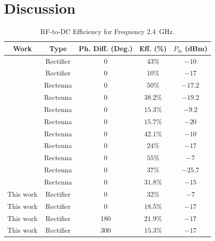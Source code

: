\documentclass[journal]{IEEEtran}
\begin{document}
\section{Discussion}
\label{sec:Discussion}
%
\begin{table}[t]
\renewcommand{\arraystretch}{1.1}
\caption{RF-to-DC  Efficiency for Frequency $2.4$~GHz.}
\label{tab:Designs}
\centering 
\begin{tabular}{c||c||c||c||c}
\hline\hline  
      Work                              & Type & Ph. Diff. (Deg.) & Eff.   (\%) & $P_\text{in}$ (dBm)  \\
\hline   \cite{lee2017hybrid}   & Rectifier & 0& $43\%$     &$-10$      \\
\hline   \cite{lee2017hybrid}   & Rectifier & 0& $10\%$     &$-17$      \\
\hline  \cite{sun2012design}            & Rectenna & 0& $50\%$       & $-17.2$    \\

\hline  \cite{georgiadis2010rectenna}   & Rectenna & 0& $38.2\%$     &$-19.2$      \\
\hline  \cite{georgiadis2010rectenna}   & Rectenna & 0& $15.3\%$     &$-9.2$      \\
\hline  \cite{vera2010design}   & Rectenna & 0& $15.7\%$     & $-20$    \\
\hline  \cite{vera2010design}   & Rectenna & 0& $42.1\%$     & $-10$    \\
\hline  \cite{olgun2010wireless}   & Rectenna & 0& $24\%$     &$-17$      \\
\hline  \cite{olgun2010wireless}   & Rectenna & 0& $55\%$     &$-7$      \\
\hline  \cite{curty2005remotely}   & Rectenna & 0& $37\%$     &$-25.7$      \\
\hline  \cite{chen2017maximum}   & Rectenna & 0& $31.8\%$     &$-15$      \\
\hline  This work                 & Rectifier & 0& $32\%$       & $-7$       \\
\hline  This work                 & Rectifier & 0& $18.5\%$       & $-17$       \\
\hline  This work                 & Rectifier & 180& $21.9\%$       & $-17$       \\
\hline  This work                 & Rectifier & 300& $15.3\%$       & $-17$       \\
%
\hline\hline
\end{tabular}
\end{table}
\end{document}
